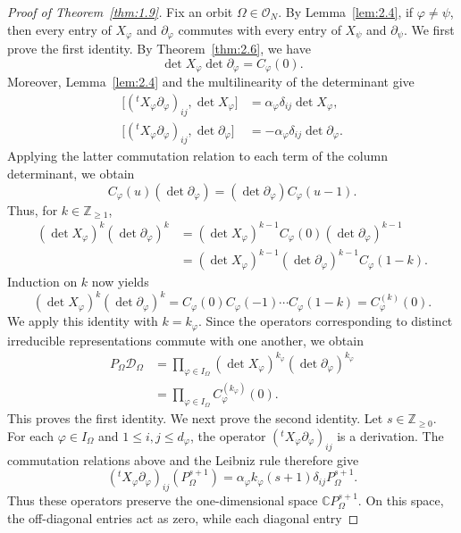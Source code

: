\documentclass[12pt,a4paper]{article}
\theoremstyle{definition}
\numberwithin{definition}{section}
\begin{document}
\begin{proof}[Proof of Theorem~\ref{thm:1.9}]
Fix an orbit $\Omega\in\mathcal O_N$.
By Lemma~\ref{lem:2.4}, if $\varphi\ne\psi$, then every entry of
$X_\varphi$ and $\partial_\varphi$ commutes with every entry of
$X_\psi$ and $\partial_\psi$.
We first prove the first identity.
By Theorem~\ref{thm:2.6}, we have
\[
\det X_\varphi\det\partial_\varphi=C_\varphi(0).
\]
Moreover, Lemma~\ref{lem:2.4} and the multilinearity of the determinant give
\[
\begin{aligned}
\bigl[
({}^tX_\varphi\partial_\varphi)_{ij},
\det X_\varphi
\bigr]
&=
\alpha_\varphi\delta_{ij}\det X_\varphi,\\
\bigl[
({}^tX_\varphi\partial_\varphi)_{ij},
\det\partial_\varphi
\bigr]
&=
-\alpha_\varphi\delta_{ij}\det\partial_\varphi.
\end{aligned}
\]
Applying the latter commutation relation to each term of the column determinant,
we obtain
\[
C_\varphi(u)(\det\partial_\varphi)
=
(\det\partial_\varphi)C_\varphi(u-1).
\]
Thus, for $k\in\mathbb Z_{\ge1}$,
\[
\begin{aligned}
(\det X_\varphi)^k(\det\partial_\varphi)^k
&=
(\det X_\varphi)^{k-1}
C_\varphi(0)(\det\partial_\varphi)^{k-1}\\
&=
(\det X_\varphi)^{k-1}
(\det\partial_\varphi)^{k-1}C_\varphi(1-k).
\end{aligned}
\]
Induction on $k$ now yields
\[
(\det X_\varphi)^k(\det\partial_\varphi)^k
=
C_\varphi(0)C_\varphi(-1)\cdots C_\varphi(1-k)
=
C_\varphi^{(k)}(0).
\]
We apply this identity with $k=k_\varphi$.
Since the operators corresponding to distinct irreducible representations
commute with one another, we obtain
\[
\begin{aligned}
P_\Omega\mathcal D_\Omega
&=
\prod_{\varphi\in I_\Omega}
(\det X_\varphi)^{k_\varphi}
(\det\partial_\varphi)^{k_\varphi}\\
&=
\prod_{\varphi\in I_\Omega}
C_\varphi^{(k_\varphi)}(0).
\end{aligned}
\]
This proves the first identity.
We next prove the second identity.
Let $s\in\mathbb Z_{\ge0}$.
For each $\varphi\in I_\Omega$ and $1\leq i,j\leq d_\varphi$, the operator
$({}^tX_\varphi\partial_\varphi)_{ij}$ is a derivation.
The commutation relations above and the Leibniz rule therefore give
\[
({}^tX_\varphi\partial_\varphi)_{ij}
(P_\Omega^{s+1})
=
\alpha_\varphi k_\varphi(s+1)\delta_{ij}P_\Omega^{s+1}.
\]
Thus these operators preserve the one-dimensional space
$\mathbb C P_\Omega^{s+1}$.
On this space, the off-diagonal entries act as zero, while each diagonal entry

\end{proof}
\end{document}
